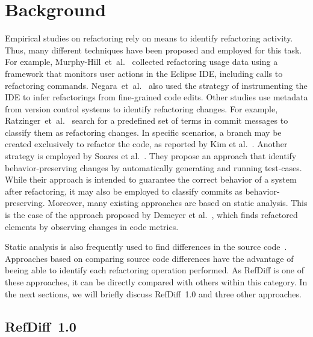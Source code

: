 \section{Background}
\label{SecBackground}

Empirical studies on refactoring rely on means to identify refactoring activity. Thus, many different techniques have been proposed and employed for this task.
For example, Murphy-Hill~et~al.~\cite{MurphyHill2012} collected refactoring usage data using a framework that monitors user actions in the Eclipse IDE, including calls to refactoring commands.
Negara~et~al.~\cite{negara2013} also used the strategy of instrumenting the IDE to infer refactorings from fine-grained code edits.
Other studies use metadata from version control systems to identify refactoring changes. For example, Ratzinger~et~al.~\cite{ratzinger2008relation} search for a predefined set of terms in commit messages to classify them as refactoring changes. In specific scenarios, a branch may be created exclusively to refactor the code, as reported by Kim et al.~\cite{kim-tse-2014}.
Another strategy is employed by Soares et al.~\cite{soares2010making}. They propose an approach that identify behavior-preserving changes by automatically generating and running test-cases. While their approach is intended to guarantee the correct behavior of a system after refactoring, it may also be employed to classify commits as behavior-preserving.
Moreover, many existing approaches are based on static analysis.
This is the case of the approach proposed by Demeyer et al.~\cite{demeyer2000finding}, which finds refactored elements by observing changes in code metrics.

Static analysis is also frequently used to find differences in the source code~\cite{dig2006automated, weissgerber2006identifying, tsantalis_empiricalstudy,prete2010template,Kim:2010:RefFinder,msr2017,tsantalis2018rminer}.
Approaches based on comparing source code differences have the advantage of beeing able to identify each refactoring operation performed. As RefDiff is one of these approaches, it can be directly compared with others within this category. In the next sections, we will briefly discuss RefDiff~1.0 and three other approaches.

\subsection{RefDiff~1.0}

